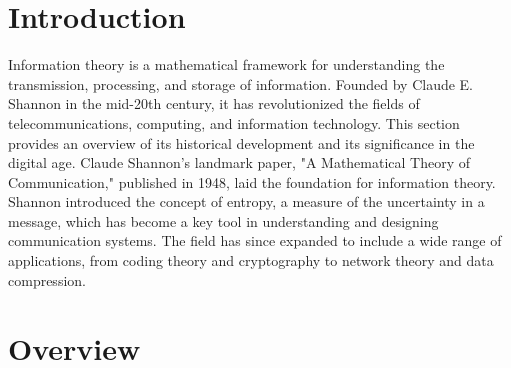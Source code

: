 \documentclass[12pt]{article}
\begin{document}
	
	
	\section{Introduction}
	
	Information theory is a mathematical framework for understanding the transmission, processing, and storage of information. Founded by Claude E. Shannon in the mid-20th century, it has revolutionized the fields of telecommunications, computing, and information technology. This section provides an overview of its historical development and its significance in the digital age. Claude Shannon's landmark paper, "A Mathematical Theory of Communication," published in 1948, laid the foundation for information theory. Shannon introduced the concept of entropy, a measure of the uncertainty in a message, which has become a key tool in understanding and designing communication systems. The field has since expanded to include a wide range of applications, from coding theory and cryptography to network theory and data compression.
	
	\section{Overview }
\end{document}

